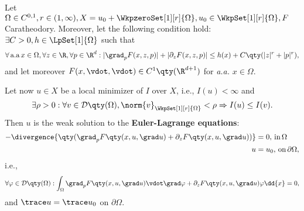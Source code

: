 \begin{lemma}
	Let $\Omega \in C^{0,1}, r \in(1,\infty), X = u_0 + \WkpzeroSet[1][r]{\Omega}, u_0 \in \WkpSet[1][r]{\Omega}, F$ Caratheodory. Moreover, let the following condition hold: $\exists C>0, h \in \LpSet[1]{\Omega}$ such that 
	\[
		 \forall \, \text{a.a} \, x \in \Omega, \forall z \in \R, \forall p \in \R^d: |\grad_p F(x,z,p)|+|\partial_{z} F(x,z,p)| \leq h(x) + C\qty(|z|^r + |p|^r),
	\]
	and let moreover $F(x,\vdot, \vdot) \in C^1\qty(\R^{d+1})$ for \textit{a.a.} $x \in \Omega.$

	Let now $u \in X$ be a local minimizer of $I$ over $X$, i.e., $I(u) < \infty$ and
	\[
		\exists \rho>0: \forall v \in \mathcal{D}\qty(\Omega), \norm{v}_{\WkpSet[1][r]{\Omega}} < \rho \Rightarrow I(u) \leq I(v).
	\]
	Then $u$ is the weak solution to the \textbf{Euler-Lagrange equations}:
		\begin{align*}
			- \divergence{\qty(\grad_p F\qty(x, u, \grad u)+ \partial_{z}F\qty(x, u, \grad u))} &= 0, \, \text{in} \, \Omega \\
			u &= u_0, \, \text{on} \, \partial \Omega,
		\end{align*}
	i.e.,
	\begin{align*}
		\forall \varphi \in \mathcal{D}\qty(\Omega): \int_{\Omega}\grad_p F\qty(x, u, \grad u) \vdot \grad \varphi + \partial_{z}F\qty(x, u, \grad u) \varphi \dd{x} = 0,\\
	\end{align*} 
	and $\trace u = \trace u_0$ on $\partial \Omega.$
\end{lemma}
